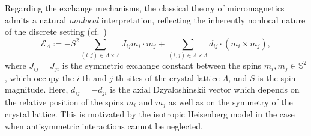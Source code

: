 \documentclass[reqno,11pt]{amsart}
\numberwithin{equation}{section}
\theoremstyle{thmlemcorr}
\numberwithin{theorem}{section}
\theoremstyle{thmlemcorr*}
\theoremstyle{defi}
\theoremstyle{remexample}
\theoremstyle{ass}
\renewcommand{\S}{\mathbb{S}}
\newcommand{\1}{\mathds{1}}
\begin{document}
Regarding the exchange mechanisms, the classical theory of micromagnetics admits a natural \textit{nonlocal} interpretation, reflecting the inherently nonlocal nature of the discrete setting (cf.\ \cite{He28, Kef62})
\begin{equation} \label{eq:Heinsenberg}
  \mathcal{E}_{\Lambda} 
  :=  - S^2  \sum_{(i, j) \in \Lambda \times \Lambda} J_{ij} m_i \cdot m_j
  + \sum_{(i, j) \in \Lambda \times \Lambda} d_{ij} \cdot (m_i \times m_j),
\end{equation} where $J_{ij} = J_{ji}$ is the symmetric exchange constant between the spins
$m_i, m_j \in \S^2$, which occupy the $i$-th and $j$-th sites of the crystal
lattice $\Lambda$, and $S$ is the spin magnitude. Here, $d_{ij} = - d_{ji}$ is the axial Dzyaloshinskii vector which depends on  the relative position of the spins $m_i$ and
$m_j$ as well as on the symmetry of the crystal lattice. This is motivated by the isotropic Heisenberg model in the case when antisymmetric interactions cannot be neglected.
\end{document}
